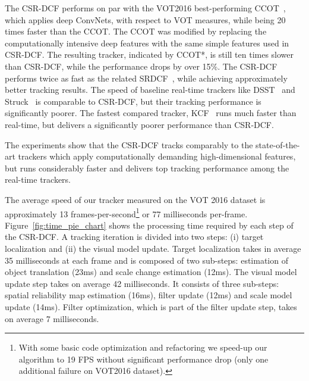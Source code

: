 \documentclass[twocolumn]{article}
\begin{document}
The  CSR-DCF performs on par with the VOT2016 best-performing CCOT~\citep{danelljan_eccv2016_ccot}, which applies deep ConvNets, with respect to VOT measures, while being 20 times faster than the CCOT. 
The CCOT was modified by replacing the computationally intensive deep features with the same simple features used in CSR-DCF. The resulting tracker, indicated by CCOT*, is still ten times slower than CSR-DCF, while the performance drops by over 15\%. The  CSR-DCF performs twice as fast as the related SRDCF~\citep{srdcf_iccv2015}, while achieving approximately  better tracking results. 
The speed of baseline real-time trackers like DSST~\citep{danelljan2014accurate} and Struck~\citep{hare_struck} is comparable to CSR-DCF, but their tracking performance is significantly poorer. The fastest compared tracker, KCF~\citep{henriques2015tracking} runs much faster than real-time, but delivers a significantly poorer performance than CSR-DCF. 
 
The experiments show that the CSR-DCF tracks comparably to the state-of-the-art trackers which apply computationally demanding high-dimensional features, but runs considerably faster and delivers top tracking performance among the real-time trackers. 

The average speed of our tracker measured on the VOT 2016 dataset is approximately 13 frames-per-second\footnote{With some basic code optimization and refactoring we speed-up our algorithm to 19 FPS without significant performance drop (only one additional failure on VOT2016 dataset).} or 77 milliseconds per-frame. Figure~\ref{fig:time_pie_chart} shows the processing time required by each step of the CSR-DCF. A tracking iteration is divided into two steps: (i) target localization and (ii) the visual model update. Target localization takes in average 35 milliseconds at each frame and is composed of two sub-steps: estimation of object translation (23ms) and scale change estimation (12ms). The visual model update step takes on average 42 milliseconds. It consists of three sub-steps: spatial reliability map estimation (16ms), filter update (12ms) and scale model update (14ms). Filter optimization, which is part of the filter update step, takes on average 7 milliseconds.
\end{document}

